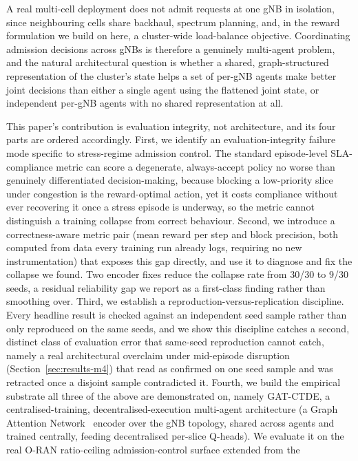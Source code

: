 \documentclass[journal]{IEEEtran}
\begin{document}
A real multi-cell deployment does not admit requests at one gNB in
isolation, since neighbouring cells share backhaul, spectrum planning, and,
in the reward formulation we build on here, a cluster-wide
load-balance objective. Coordinating admission decisions across gNBs
is therefore a genuinely multi-agent problem, and the natural
architectural question is whether a shared, graph-structured
representation of the cluster's state helps a set of per-gNB agents
make better joint decisions than either a single agent using the
flattened joint state, or independent per-gNB agents with no shared
representation at all.

This paper's contribution is evaluation integrity, not architecture,
and its four parts are ordered accordingly. First, we identify an
evaluation-integrity failure mode specific to stress-regime admission
control. The standard episode-level SLA-compliance metric can score a
degenerate, always-accept policy no worse than genuinely differentiated
decision-making, because blocking a low-priority slice under
congestion is the reward-optimal action, yet it costs compliance without
ever recovering it once a stress episode is underway, so the metric
cannot distinguish a training collapse from correct behaviour. Second,
we introduce a correctness-aware metric pair (mean reward per step and
block precision, both computed from data every training run already
logs, requiring no new instrumentation) that exposes this gap directly,
and use it to diagnose and fix the collapse we found. Two encoder
fixes reduce the collapse rate from 30/30 to 9/30 seeds, a residual
reliability gap we report as a first-class finding rather than
smoothing over. Third, we establish a reproduction-versus-replication
discipline. Every headline result is checked against an independent
seed sample rather than only reproduced on the same seeds, and we show
this discipline catches a second, distinct class of evaluation error
that same-seed reproduction cannot catch, namely a real architectural
overclaim under mid-episode disruption (Section~\ref{sec:results-m4})
that read as confirmed on one seed sample and was retracted once a
disjoint sample contradicted it. Fourth, we build the empirical
substrate all three of the above are demonstrated on, namely GAT-CTDE,
a centralised-training, decentralised-execution multi-agent architecture (a Graph Attention
Network~\cite{gat} encoder over the gNB topology, shared across agents
and trained centrally, feeding decentralised per-slice Q-heads). We
evaluate it on the
real O-RAN ratio-ceiling admission-control surface extended from the
\end{document}

